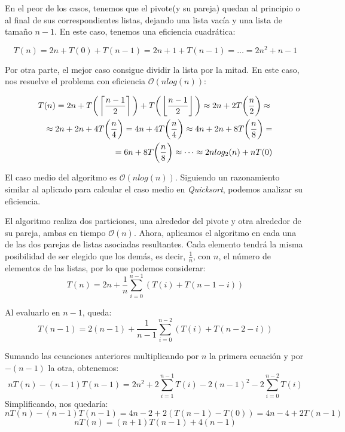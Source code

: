 \documentclass[a4paper, 11pt]{article} %
\begin{document}
      En el peor de los casos, tenemos que el pivote(y su pareja) quedan al principio o al final de sus correspondientes listas, dejando una lista vacía y una lista de tamaño $n-1$. En este caso, tenemos una eficiencia cuadrática:
      
	  \begin{equation}
	  	T(n) = 2n + T(0) + T(n-1) = 2n + 1 + T(n-1) = \dots = 2n^2 + n - 1
	  \end{equation}
      
      Por otra parte, el mejor caso consigue dividir la lista por la mitad. En este caso, nos resuelve el problema con eficiencia $\mathcal{O}(nlog(n))$:
      
	  \begin{eqnarray*}
	  \lefteqn{T(n) = 2n + T\bigg(\left\lceil \frac{n-1}{2} \right\rceil\bigg) + T\bigg(\left\lfloor \frac{n-1}{2}\right\rfloor\bigg) \approx 2n + 2T\bigg(\frac{n}{2}\bigg) \approx} \\
	  && \approx 2n + 2n + 4T\bigg(\frac{n}{4}\bigg) = 4n + 4T\bigg(\frac{n}{4}\bigg)\approx 4n + 2n + 8T\bigg(\frac{n}{8}\bigg) = \\ 
	  && = 6n + 8T\bigg(\frac{n}{8}\bigg) \approx \dots \approx 2nlog_2(n) + n T(0)
	  \end{eqnarray*}
	  
      El caso medio del algoritmo es $\mathcal{O}(nlog(n)) $. Siguiendo un razonamiento similar al aplicado para calcular el caso medio en \textit{Quicksort}, podemos analizar su eficiencia.
    
      El algoritmo realiza dos particiones, una alrededor del pivote y otra alrededor de su pareja, ambas en tiempo $\mathcal{O}(n)$. Ahora, aplicamos el algoritmo
      en cada una de las dos parejas de listas asociadas resultantes. Cada elemento tendrá la misma posibilidad de ser elegido que los demás, es decir, $\frac{1}{n}$,
      con $n$, el número de elementos de las listas, por lo que podemos considerar:
      \begin{equation}
		T(n) = 2n + \frac{1}{n}\sum_{i=0}^{n-1}\left(T(i) + T(n-1-i) \right)
      \end{equation}
      
      Al evaluarlo en $n-1$, queda:
      \begin{equation}
      	T(n-1) = 2(n-1) + \frac{1}{n-1}\sum_{i=0}^{n-2}\left(T(i) + T(n-2-i) \right)
      \end{equation}
      
      Sumando las ecuaciones anteriores multiplicando por $n$ la primera ecuación y por $-(n-1)$ la otra, obtenemos:
      \begin{equation}
        nT(n) - (n-1)T(n-1) = 2n^2 + 2\sum^{n-1}_{i=1} T(i) - 2(n-1)^2 - 2\sum_{i=0}^{n-2}T(i)
      \end{equation}
      Simplificando, nos quedaría:
	  \begin{equation}
	    nT(n) - (n-1)T(n-1) = 4n-2 + 2(T(n-1) - T(0)) = 4n - 4 + 2T(n-1) 
	  \end{equation}
	  \begin{equation}
	    nT(n) = (n+1)T(n-1) + 4(n-1)
	  \end{equation}
	  
\end{document}

